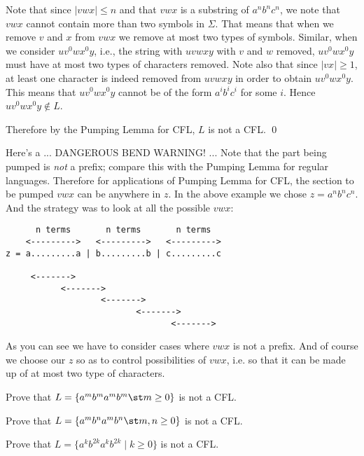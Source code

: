 Note that since $|vwx| \leq n$ and that $vwx$ is a substring of
$a^nb^nc^n$, we note that $vwx$ cannot contain more than two symbols
in $\Sigma$. That means that when we remove $v$ and $x$ from $vwx$
we remove at most two types of symbols. Similar, when we consider
$uv^0wx^0y$, i.e., the string with $uvwxy$ with $v$ and $w$ removed,
$uv^0wx^0y$ must have at most two types of characters removed. Note
also that since $|vx| \geq 1$, at least one character is indeed
removed from $uvwxy$ in order to obtain $uv^0wx^0y$. This means that
$uv^0wx^0y$ cannot be of the form $a^i b^i c^i$ for some $i$. Hence
$uv^0wx^0y \notin L$.

Therefore by the Pumping Lemma for CFL, $L$ is not a CFL. 
\qed

Here's a ... DANGEROUS BEND WARNING! ...
Note that the part being pumped is \textit{not} a prefix;
compare this with the Pumping Lemma for regular languages.
Therefore for applications of Pumping Lemma for CFL, the section to be pumped
$vwx$ can be anywhere in $z$.
In the above example we chose $z = a^n b^n c^n$.
And the strategy was to look at all the possible $vwx$:
\begin{verbatim}
      n terms       n terms       n terms
    <--------->   <--------->   <--------->
z = a.........a | b.........b | c.........c

     <------->
           <------->
                   <------->
                          <------->
                                 <------->
\end{verbatim}

As you can see we have to consider cases where $vwx$ is not a prefix.
And of course we choose our $z$ so as to control possibilities of $vwx$, i.e.
so that it can be made up of at most two type of characters.




\newpage
\begin{ex}
Prove that $L = \{ a^m b^m a^m b^m \st m \geq 0 \}$ is not a CFL.
\end{ex}



\newpage
\begin{ex}
Prove that $L = \{ a^m b^n a^m b^n \st m, n \geq 0 \}$ is not a CFL.
\end{ex}

\newpage
\begin{ex}
Prove that $L = \{ a^k b^{2k} a^k b^{2k} \mid k \geq 0 \}$ is not a CFL.
\end{ex}

